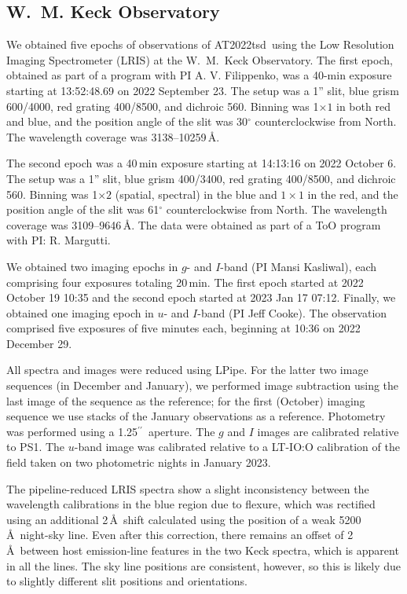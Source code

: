 \documentclass{nature_plusfigure}
\newcommand{\at}{AT2022tsd}
\newcommand{\arcsec}{$^{\prime\prime}$}
\begin{document}
\begin{methods}

\subsection{W.~M. Keck Observatory}
\label{sec:keck}

We obtained five epochs of observations of \at\ using the Low Resolution Imaging Spectrometer (LRIS) at the W.~M.~Keck Observatory. The first epoch, obtained as part of a program with PI A. V. Filippenko, was a 40-min exposure starting at 13:52:48.69 on 2022 September 23. The setup was a 1'' slit, blue grism 600/4000, red grating 400/8500, and dichroic 560. Binning was 1$\times1$ in both red and blue, and the position angle of the slit was 30$^\circ$ counterclockwise from North. The wavelength coverage was 3138--10259\,\AA. 

The second epoch was a 40\,min exposure starting at 14:13:16 on 2022 October 6. The setup was a 1'' slit, blue grism 400/3400, red grating 400/8500, and dichroic 560. Binning was 1$\times2$ (spatial, spectral) in the blue and $1\times1$ in the red, and the position angle of the slit was 61$^\circ$ counterclockwise from North. The wavelength coverage was 3109--9646\,\AA. The data were obtained as part of a ToO program with PI: R. Margutti. 

We obtained two imaging epochs in $g$- and $I$-band (PI Mansi Kasliwal), each comprising four exposures totaling 20\,min. The first epoch started at 2022 October 19 10:35 and the second epoch started at 2023 Jan 17 07:12. 
Finally, we obtained one imaging epoch in $u$- and $I$-band (PI Jeff Cooke). The observation comprised five exposures of five minutes each, beginning at 10:36 on 2022 December 29.

All spectra and images were reduced using LPipe\cite{PerleyLPipe}.
For the latter two image sequences (in December and January), we performed image subtraction using the last image of the sequence as the reference; for the first (October) imaging sequence we use stacks of the January observations as a reference.  Photometry was performed using a 1.25\arcsec\ aperture.  The $g$ and $I$ images are calibrated relative to PS1.  The $u$-band image was calibrated relative to a LT-IO:O calibration of the field taken on two photometric nights in January 2023.

The pipeline-reduced LRIS spectra show a slight inconsistency between the wavelength calibrations in the blue region due to flexure, which was rectified using an additional 2\,\AA\ shift calculated using the position of a weak 5200\,\AA\ night-sky line.
Even after this correction, there remains an offset of 2\,\AA\ between host emission-line features in the two Keck spectra, which is apparent in all the lines. The sky line positions are consistent, however, so this is likely due to slightly different slit positions and orientations. 



\end{methods}
\end{document}

